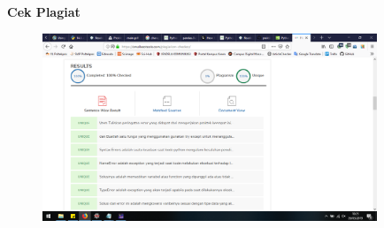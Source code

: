 \textbf{Cek Plagiat}
\begin{figure}[H]
	\includegraphics[width=10cm]{figures/diva/Chapter4/harikedua/plagiatpenanganan.png}
	\centering
\end{figure}

